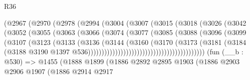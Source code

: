 \begin{lexlean}{R36}
\begin{coremodule}
                            (@2967
                              (@2970
                                (@2978
                                  (@2994
                                    (@3004
                                      (@3007
                                        (@3015
                                          (@3018
                                            (@3026
                                              (@3042
                                                (@3052
                                                  (@3055
                                                    (@3063
                                                      (@3066
                                                        (@3074
                                                          (@3077
                                                            (@3085
                                                              (@3088
                                                                (@3096
                                                                  (@3099
                                                                    (@3107
                                                                      (@3123
                                                                        (@3133
                                                                          (@3136
                                                                            (@3144
                                                                              (@3160
                                                                                (@3170
                                                                                  (@3173
                                                                                    (@3181
                                                                                      (@3184
                                                                                        (@3188
                                                                                          @3190
                                                                                          @1397
                                                                                          @536)))))))))))))))))))))))))))))))))))))))))))
    (fun (__b : @530) =>
    @1455
      (@1888
        @1899
        (@1886
          @2892
          @2895
          @1903
          (@1886
            @2903
            @2906
            @1907
            (@1886
              @2914
              @2917

\end{coremodule}
\end{lexlean}

